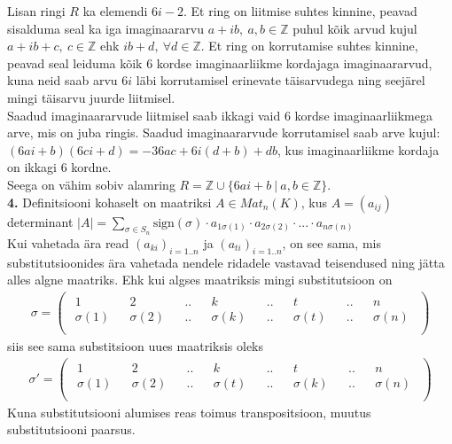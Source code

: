 \documentclass{article}
\begin{document}
Lisan ringi $R$ ka elemendi $6i-2$. Et ring on liitmise suhtes kinnine, peavad sisalduma seal ka iga imaginaararvu $a+ib,\ a,b\in\mathbb{Z}$ puhul kõik arvud kujul $a+ib+c,\ c\in\mathbb{Z}$ ehk $ib+d,\ \forall d\in\mathbb{Z}$. Et ring on korrutamise suhtes kinnine, peavad seal leiduma kõik 6 kordse imaginaarliikme kordajaga imaginaararvud, kuna neid saab arvu $6i$ läbi korrutamisel erinevate täisarvudega ning seejärel mingi täisarvu juurde liitmisel.\\
Saadud imaginaararvude liitmisel saab ikkagi vaid 6 kordse imaginaarliikmega arve, mis on juba ringis. Saadud imaginaararvude korrutamisel saab arve kujul: $(6ai+b)(6ci+d)=-36ac+6i(d+b)+db$, kus imaginaarliikme kordaja on ikkagi 6 kordne.\\
Seega on vähim sobiv alamring $R=\mathbb{Z}\cup\{6ai+b\ |\ a,b\in\mathbb{Z}\}$.
\pagebreak\\
\textbf{4.} Definitsiooni kohaselt on maatriksi $A\in Mat_n(K)$, kus $A=(a_{ij})$ determinant $|A|=\sum_{\sigma\in S_n}\text{sign}(\sigma)\cdot a_{1\sigma(1)}\cdot a_{2\sigma(2)}\cdot ...\cdot a_{n\sigma(n)}$\\
Kui vahetada ära read $(a_{ki})_{i=1..n}$ ja $(a_{ti})_{i=1..n}$, on see sama, mis substitutsioonides ära vahetada nendele ridadele vastavad teisendused ning jätta alles algne maatriks. Ehk kui algses maatriksis mingi substitutsioon on 
\begin{gather*}
\sigma = \begin{pmatrix}
\begin{aligned}
1 && 2 && .. && k && .. && t && .. && n\\
\sigma(1) && \sigma(2) && .. && \sigma(k) && .. && \sigma(t) && .. && \sigma(n)\\
\end{aligned}
\end{pmatrix}
\end{gather*}
siis see sama substitsioon uues maatriksis oleks
\begin{gather*}
\sigma' = \begin{pmatrix}
\begin{aligned}
1 && 2 && .. && k && .. && t && .. && n\\
\sigma(1) && \sigma(2) && .. && \sigma(t) && .. && \sigma(k) && .. && \sigma(n)\\
\end{aligned}
\end{pmatrix}
\end{gather*}
Kuna substitutsiooni alumises reas toimus transpositsioon, muutus substitutsiooni paarsus.\\
\end{document}
